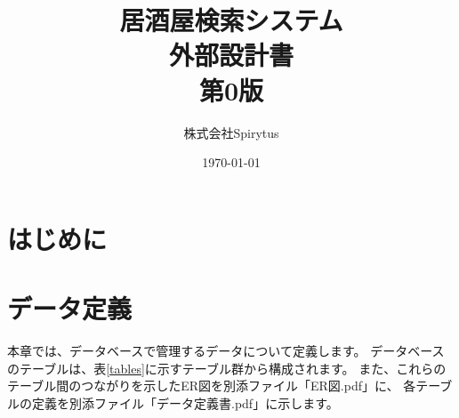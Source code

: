 \documentclass[a4j,titlepage]{jarticle}
\title{居酒屋検索システム\\
外部設計書\\
第0版}
\author{株式会社Spirytus}
\date{\today}
\begin{document}
\maketitle
\tableofcontents

\section{はじめに}

\section{データ定義}
本章では、データベースで管理するデータについて定義します。
データベースのテーブルは、表\ref{tables}に示すテーブル群から構成されます。
また、これらのテーブル間のつながりを示したER図を別添ファイル「ER図.pdf」に、
各テーブルの定義を別添ファイル「データ定義書.pdf」に示します。
​
\end{document}
